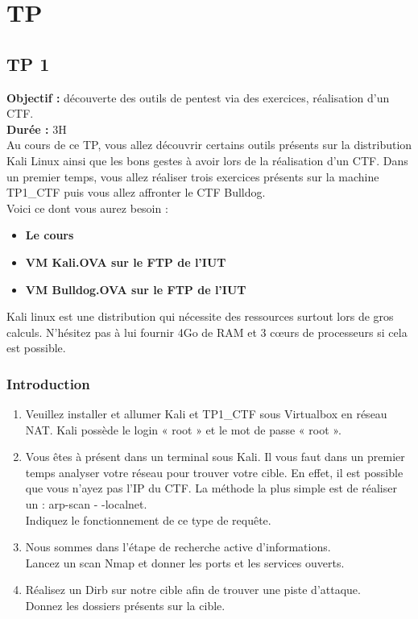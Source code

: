 \chapter{TP}

\section{TP 1}

\noindent\textbf{Objectif :} découverte des outils de pentest via des exercices, réalisation d’un CTF.\\
\textbf{Durée :} 3H\\

Au cours de ce TP, vous allez découvrir certains outils présents sur la distribution Kali Linux ainsi que les bons gestes à avoir lors de la réalisation d’un CTF. Dans un premier temps, vous allez réaliser trois exercices présents sur la machine TP1\_CTF puis vous allez affronter le CTF Bulldog. \\
\noindent Voici ce dont vous aurez besoin :

\begin{itemize}
    \item \textbf{Le cours}
    \item \textbf{VM Kali.OVA sur le FTP  de l’IUT}
    \item \textbf{VM Bulldog.OVA sur le FTP de l’IUT}
\end{itemize}

\noindent Kali linux est une distribution qui nécessite des ressources surtout lors de gros calculs. N’hésitez pas à lui fournir 4Go de RAM et 3 cœurs de processeurs si cela est possible.

\subsection{Introduction}


\begin{enumerate}
    \item Veuillez installer et allumer Kali et TP1\_CTF sous Virtualbox en réseau NAT. Kali possède le login « root » et le mot de passe « root ».
    \item Vous êtes à présent dans un terminal sous Kali. Il vous faut dans un premier temps analyser votre réseau pour trouver votre cible. En effet, il est possible que vous n’ayez pas l’IP du CTF. La méthode la plus simple est de réaliser un : arp-scan  - -localnet.\\
    Indiquez le fonctionnement de ce type de requête.
    \item Nous sommes dans l’étape de recherche active d’informations.\\
    Lancez un scan Nmap et donner les ports et les services ouverts.
    \item Réalisez un Dirb sur notre cible afin de trouver une piste d’attaque.\\ 
    Donnez les dossiers présents sur la cible.
\end{enumerate}

